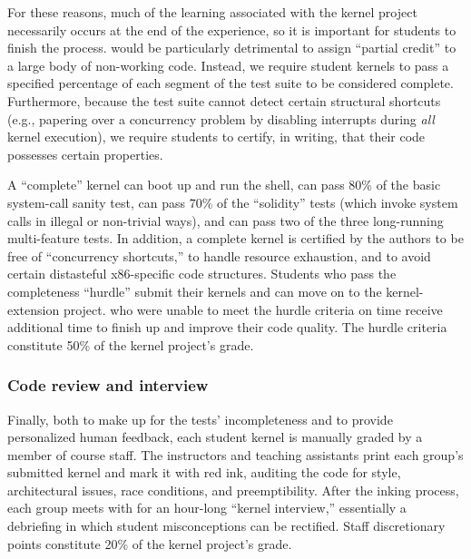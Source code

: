 For these reasons,  much of the learning
associated with the kernel project necessarily occurs
at the end of the experience,
so it is important for students to finish the process.
 would be particularly detrimental to
assign ``partial credit'' to a large body of non-working
code.
Instead, we require student kernels to pass a
specified percentage of each segment of the test
suite to be considered complete.
Furthermore,
because the test suite cannot detect certain
structural shortcuts (e.g., papering over a concurrency
problem by disabling interrupts during \textit{all}
kernel execution),
we require students to certify, in writing, that
their code possesses certain properties.

A ``complete'' kernel can boot up and run the shell,
can pass 80\% of the basic system-call sanity test,
can pass 70\% of the ``solidity'' tests (which
invoke system calls in illegal or non-trivial ways),
and can pass two of the three long-running multi-feature tests.
In addition,
a complete kernel is certified by the authors to
be free of ``concurrency shortcuts,''
to handle resource exhaustion,
and to avoid certain distasteful x86-specific code structures.
%
Students who pass the completeness ``hurdle'' submit their kernels
and can move on to the kernel-extension project.
 who were unable to meet the
hurdle criteria on time receive additional time
to finish up and improve their code quality.
The hurdle criteria constitute 50\% of the kernel project's grade.

\subsubsection{Code review and interview}

Finally, both to make up for the tests' incompleteness and to provide personalized human feedback, each student kernel is manually graded by a member of course staff.
The instructors and teaching assistants print each group's submitted kernel and mark it with red ink, auditing the code for style, architectural issues, race conditions, and preemptibility.
After the inking process, each group meets with  for an hour-long ``kernel interview,'' essentially a debriefing in which student misconceptions can be rectified.
Staff discretionary points constitute 20\% of the kernel project's grade.
